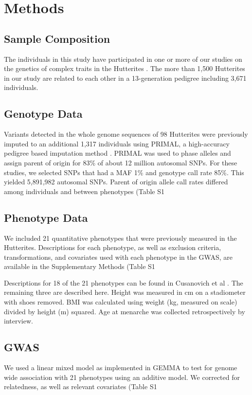 \section{Methods}\label{ch02-methods}

\subsection{Sample Composition}\label{Sample Composition}
The individuals in this study have participated in one or more of our studies on the genetics of complex traits in the Hutterites \cite{Cusanovich:2016id,Weiss:2005cq,Abney2001}. The more than 1,500 Hutterites in our study are related to each other in a 13-generation pedigree including 3,671 individuals. 

\subsection{Genotype Data}\label{Genotype Data}
Variants detected in the whole genome sequences of 98 Hutterites were previously imputed to an additional 1,317 individuals using PRIMAL, a high-accuracy pedigree based imputation method \cite{Livne2015}. PRIMAL was used to phase alleles and assign parent of origin for 83\% of about 12 million autosomal SNPs. For these studies, we selected SNPs that had a MAF 1\% and genotype call rate 85\%. This yielded 5,891,982 autosomal SNPs. Parent of origin allele call rates differed among individuals and between phenotypes (Table S1 %

\subsection{Phenotype Data}\label{Phenotype Data}
We included 21 quantitative phenotypes that were previously measured in the Hutterites. Descriptions for each phenotype, as well as exclusion criteria, transformations, and covariates used with each phenotype in the GWAS, are available in the Supplementary Methods (Table S1 %

Descriptions for 18 of the 21 phenotypes can be found in Cusanovich et al \cite{Cusanovich:2016id}. The remaining three are described here. Height was measured in cm on a stadiometer with shoes removed. BMI was calculated using weight (kg, measured on scale) divided by height (m) squared. Age at menarche was collected retrospectively by interview. 

\subsection{GWAS}\label{GWAS Methods}
We used a linear mixed model as implemented in GEMMA to test for genome wide association with 21 phenotypes using an additive model. We corrected for relatedness, as well as relevant covariates (Table S1 


